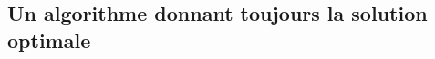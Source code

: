 \documentclass[a4,11pt]{article}
\begin{document}
\hspace{1cm}

\clearpage

%
%
%
%
%
%
%
%
%
%    
%
%
%    
%
%
%    
%
%
%    
%
%
%    	
%
	\subsection{Un algorithme donnant toujours la solution optimale}

%
%
%
%	    
%
%
%	    
%
\end{document}
